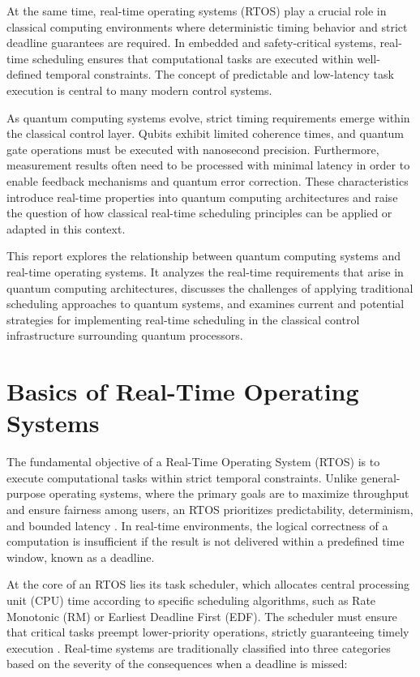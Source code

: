 \documentclass[12pt,a4paper]{article}
\begin{document}
At the same time, real-time operating systems (RTOS) play a crucial role in classical computing environments
where deterministic timing behavior and strict deadline guarantees are required. 
In embedded and safety-critical systems, real-time scheduling ensures that computational tasks 
are executed within well-defined temporal constraints. 
The concept of predictable and low-latency task execution is central to many modern control systems.

As quantum computing systems evolve, strict timing requirements emerge within the classical control layer. 
Qubits exhibit limited coherence times, and quantum gate operations must be executed with nanosecond precision. 
Furthermore, measurement results often need to be processed with minimal latency 
in order to enable feedback mechanisms and quantum error correction. 
These characteristics introduce real-time properties into quantum computing architectures 
and raise the question of how classical real-time scheduling principles can be applied or adapted in this context.

This report explores the relationship between quantum computing systems and real-time operating systems. 
It analyzes the real-time requirements that arise in quantum computing architectures, 
discusses the challenges of applying traditional scheduling approaches to quantum systems, 
and examines current and potential strategies for implementing real-time scheduling 
in the classical control infrastructure surrounding quantum processors.

\section{Basics of Real-Time Operating Systems}

The fundamental objective of a Real-Time Operating System (RTOS) is to execute computational tasks within strict temporal constraints. Unlike general-purpose operating systems, where the primary goals are to maximize throughput and ensure fairness among users, an RTOS prioritizes predictability, determinism, and bounded latency \cite{Kopetz2011}. In real-time environments, the logical correctness of a computation is insufficient if the result is not delivered within a predefined time window, known as a deadline. 

At the core of an RTOS lies its task scheduler, which allocates central processing unit (CPU) time according to specific scheduling algorithms, such as Rate Monotonic (RM) or Earliest Deadline First (EDF). The scheduler must ensure that critical tasks preempt lower-priority operations, strictly guaranteeing timely execution \cite{Liu2000}. Real-time systems are traditionally classified into three categories based on the severity of the consequences when a deadline is missed:
\end{document}
